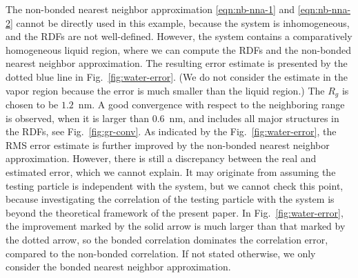 \documentclass[aps,pre,preprint,unsortedaddress]{revtex4}
\begin{document}
{  The non-bonded nearest
  neighbor approximation \eqref{eqn:nb-nna-1} and \eqref{eqn:nb-nna-2}
  cannot be directly used  in this example, 
  because the system is inhomogeneous, and the RDFs are not well-defined.
  However, the system contains a comparatively homogeneous liquid region,
  where we can compute the RDFs and the non-bonded
  nearest neighbor
  approximation. The resulting error estimate is presented by the
  dotted blue line in Fig.~\ref{fig:water-error}.
  (We do not consider the estimate in the vapor region because
  the error is much smaller than the liquid region.)
  The $R_g$ is chosen to be $1.2$~\textsf{nm}. A good
  convergence with respect to the neighboring range is observed,
  when it is larger than $0.6$~\textsf{nm},
  and includes all major structures in the RDFs,
  see Fig.~\ref{fig:gr-conv}.
  As indicated by the Fig.~\ref{fig:water-error},
  the RMS error estimate is further improved by the non-bonded
  nearest neighbor approximation.
  However, there is still a discrepancy between the real and estimated
  error, which we cannot explain. It may originate from 
  assuming the testing particle is independent with the system, but
  we cannot check this point, because investigating the
  correlation of the testing
  particle with the system is beyond the theoretical framework of the
  present paper.
  In Fig.~\ref{fig:water-error}, the improvement marked by the solid
  arrow is much larger than that marked by the dotted arrow,
  so the bonded correlation dominates the correlation error, compared to
  the non-bonded correlation.
  If not stated otherwise,
  we only consider the bonded nearest neighbor approximation.}

\end{document}
